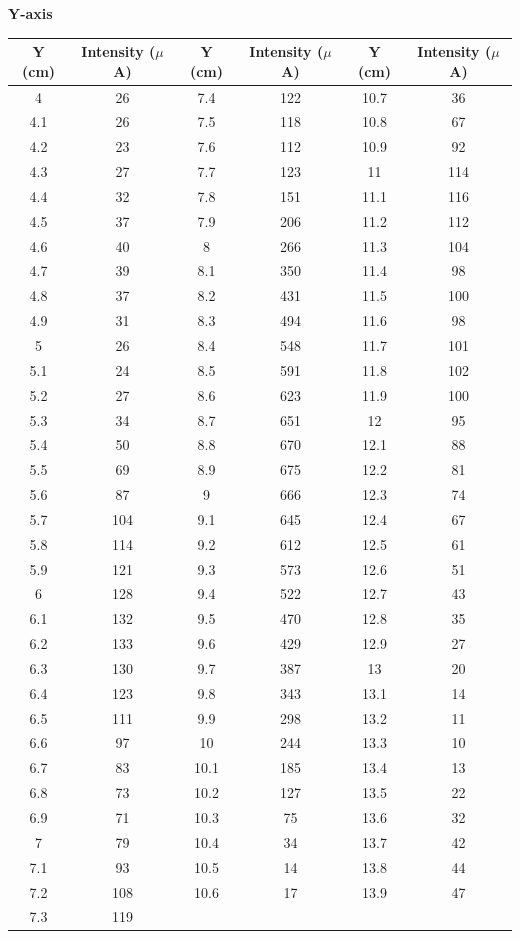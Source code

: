 \documentclass[12pt]{report}
\begin{document}
\newpage
\textbf{Y-axis}
\begin{center}
	\begin{tabular}{ |c|c|c|c|c|c| } 
		\hline
		Y (cm) & Intensity ($\mu$A) & Y (cm) & Intensity ($\mu$A) & Y (cm) & Intensity ($\mu$A) \\ 
		\hline
		4   & 26  & 7.4  & 122 & 10.7 & 36  \\
		4.1 & 26  & 7.5  & 118 & 10.8 & 67  \\
		4.2 & 23  & 7.6  & 112 & 10.9 & 92  \\
		4.3 & 27  & 7.7  & 123 & 11   & 114 \\
		4.4 & 32  & 7.8  & 151 & 11.1 & 116 \\
		4.5 & 37  & 7.9  & 206 & 11.2 & 112 \\
		4.6 & 40  & 8    & 266 & 11.3 & 104 \\
		4.7 & 39  & 8.1  & 350 & 11.4 & 98  \\
		4.8 & 37  & 8.2  & 431 & 11.5 & 100 \\
		4.9 & 31  & 8.3  & 494 & 11.6 & 98  \\
		5   & 26  & 8.4  & 548 & 11.7 & 101 \\
		5.1 & 24  & 8.5  & 591 & 11.8 & 102 \\
		5.2 & 27  & 8.6  & 623 & 11.9 & 100 \\
		5.3 & 34  & 8.7  & 651 & 12   & 95  \\
		5.4 & 50  & 8.8  & 670 & 12.1 & 88  \\
		5.5 & 69  & 8.9  & 675 & 12.2 & 81  \\
		5.6 & 87  & 9    & 666 & 12.3 & 74  \\
		5.7 & 104 & 9.1  & 645 & 12.4 & 67  \\
		5.8 & 114 & 9.2  & 612 & 12.5 & 61  \\
		5.9 & 121 & 9.3  & 573 & 12.6 & 51  \\
		6   & 128 & 9.4  & 522 & 12.7 & 43  \\
		6.1 & 132 & 9.5  & 470 & 12.8 & 35  \\
		6.2 & 133 & 9.6  & 429 & 12.9 & 27  \\
		6.3 & 130 & 9.7  & 387 & 13   & 20  \\
		6.4 & 123 & 9.8  & 343 & 13.1 & 14  \\
		6.5 & 111 & 9.9  & 298 & 13.2 & 11  \\
		6.6 & 97  & 10   & 244 & 13.3 & 10  \\
		6.7 & 83  & 10.1 & 185 & 13.4 & 13  \\
		6.8 & 73  & 10.2 & 127 & 13.5 & 22  \\
		6.9 & 71  & 10.3 & 75  & 13.6 & 32  \\
		7   & 79  & 10.4 & 34  & 13.7 & 42  \\
		7.1 & 93  & 10.5 & 14  & 13.8 & 44  \\
		7.2 & 108 & 10.6 & 17  & 13.9 & 47  \\
		7.3 & 119 &      &     &      &     \\
		\hline
	\end{tabular}
	\\
\end{center}
\end{document}
